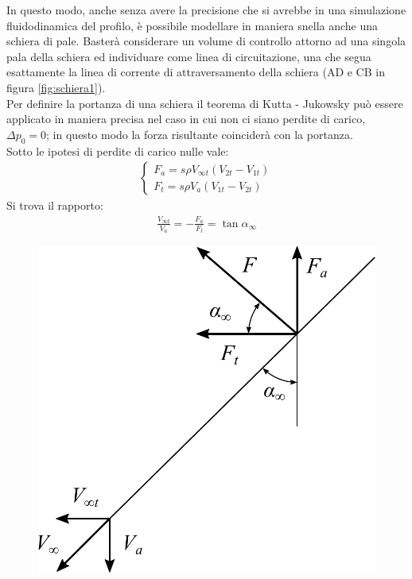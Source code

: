 In questo modo, anche senza avere la precisione che si avrebbe in una simulazione fluidodinamica del profilo, è possibile modellare in maniera snella anche una schiera di pale. Basterà considerare un volume di controllo attorno ad una singola pala della schiera ed individuare come linea di circuitazione, una che segua esattamente la linea di corrente di attraversamento della schiera (AD e CB in figura \ref{fig:schiera1}).\\
Per definire la portanza di una schiera il teorema di Kutta - Jukowsky può essere applicato in maniera precisa nel caso in cui non ci siano perdite di carico, $\Delta p_0=0$; in questo modo la forza risultante coinciderà con la portanza.\\
Sotto le ipotesi di perdite di carico nulle vale:
\begin{align*}
\begin{cases}
F_a = s \rho V_{\infty t} (V_{2t}-V_{1t})\\
F_t = s \rho V_a (V_{1t}-V_{2t})
\end{cases}
\end{align*}
Si trova il rapporto:
\begin{align*}
	\frac{V_{\infty t}}{V_a}=-\frac{F_a}{F_t} = \tan \alpha_{\infty}
\end{align*}
\begin{figure}
	\centering
	\begin{minipage}{.4\textwidth}
		\centering
		\includegraphics[width=.95\linewidth]{fig/forzaKJ.pdf}
		\label{fig:forzaKJ}
	\end{minipage}
\end{figure}
